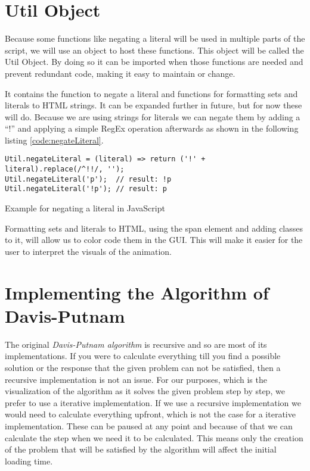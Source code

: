 \section{Util Object}
\label{sec:impUtil}
Because some functions like negating a literal will be used in multiple parts of the script, we will use an object to host these functions. This object will be called the Util Object. By doing so it can be imported when those functions are needed and prevent redundant code, making it easy to maintain or change.

It contains the function to negate a literal and functions for formatting sets and literals to HTML strings. It can be expanded further in future, but for now these will do.
Because we are using strings for literals we can negate them by adding a ``!'' and applying a simple RegEx operation afterwards as shown in the following listing \ref{code:negateLiteral}.

\begin{listing}[h!]
\begin{verbatim}
Util.negateLiteral = (literal) => return ('!' + literal).replace(/^!!/, '');
Util.negateLiteral('p');  // result: !p
Util.negateLiteral('!p'); // result: p
\end{verbatim}
    \caption{Example for negating a literal in JavaScript}
    \label{code:negateLiteral}
\end{listing}

Formatting sets and literals to HTML, using the span element and adding classes to it, will allow us to color code them in the GUI. This will make it easier for the user to interpret the visuals of the animation.

\section{Implementing the Algorithm of Davis-Putnam}
\label{sec:impDavisPutnam}
The original \textit{Davis-Putnam algorithm} is recursive and so are most of its implementations. If you were to calculate everything till you find a possible solution or the response that the given problem can not be satisfied, then a recursive implementation is not an issue. For our purposes, which is the visualization of the algorithm as it solves the given problem step by step, we prefer to use a iterative implementation. If we use a recursive implementation we would need to calculate everything upfront, which is not the case for a iterative implementation. These can be paused at any point and because of that we can calculate the step when we need it to be calculated. This means only the creation of the problem that will be satisfied by the algorithm will affect the initial loading time.

